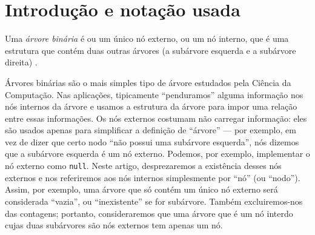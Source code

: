 \section{Introdução e notação usada}

\begin{definition}
    Uma \emph{árvore binária}
    é ou um único nó externo,
    ou um nó interno,
    que é uma estrutura que contém duas outras árvores
    (a subárvore esquerda e a subárvore direita)
    \cite[p.~257]{SedgewickFlajolet2013}.
\end{definition}

Árvores binárias são o mais simples tipo de árvore
estudados pela Ciência da Computação.
Nas aplicações,
tipicamente ``penduramos'' alguma informação nos nós internos da árvore
e usamos a estrutura da árvore para impor uma relação entre essas informações.
Os nós externos costumam não carregar informação:
eles são usados apenas para simplificar a definição de ``árvore''
--- por exemplo,
em vez de dizer que certo nodo ``não possui uma subárvore esquerda'',
nós dizemos que a subárvore esquerda é um nó externo.
Podemos, por exemplo,
implementar o nó externo como \texttt{null}.
Neste artigo,
desprezaremos a existência desses nós externos
e nos referiremos aos nós internos simplesmente por ``nó'' (ou ``nodo'').
Assim, por exemplo,
uma árvore que só contém um único nó externo
será considerada ``vazia'', ou ``inexistente'' se for subárvore.
Também excluiremos-nos das contagens;
portanto, consideraremos que
uma árvore que é um nó interdo cujas duas subárvores são nós externos
tem apenas um nó.

